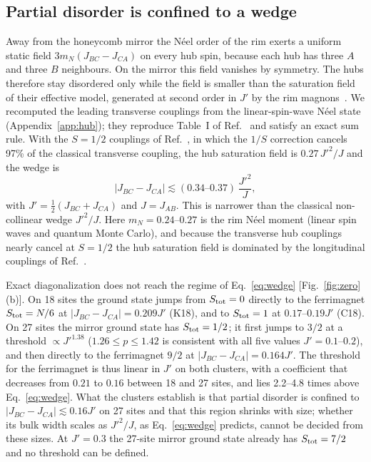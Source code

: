 \documentclass[prb,twocolumn,superscriptaddress,amsmath,amssymb,floatfix]{revtex4-2}
\begin{document}
\subsection{Partial disorder is confined to a wedge}
Away from the honeycomb mirror the N\'eel order of the rim exerts a uniform static field $3m_N(J_{BC}-J_{CA})$ on every hub spin, because each hub has three $A$ and three $B$ neighbours. On the mirror this field vanishes by symmetry. The hubs therefore stay disordered only while the field is smaller than the saturation field of their effective model, generated at second order in $J'$ by the rim magnons~\cite{SeifertVojta2019}. We recomputed the leading transverse couplings from the linear-spin-wave N\'eel state (Appendix~\ref{app:hub}); they reproduce Table~I of Ref.~\cite{SeifertVojta2019} and satisfy an exact sum rule. With the $S=1/2$ couplings of Ref.~\cite{SeifertVojta2019}, in which the $1/S$ correction cancels 97\% of the classical transverse coupling, the hub saturation field is $0.27\,J'^2/J$ and the wedge is
\begin{equation}
|J_{BC}-J_{CA}|\lesssim(0.34\text{--}0.37)\,\frac{J'^2}{J},
\label{eq:wedge}
\end{equation}
with $J'=\tfrac12(J_{BC}+J_{CA})$ and $J=J_{AB}$.
This is narrower than the classical non-collinear wedge $J'^2/J$. Here $m_N=0.24$--$0.27$ is the rim N\'eel moment (linear spin waves and quantum Monte Carlo), and because the transverse hub couplings nearly cancel at $S=1/2$ the hub saturation field is dominated by the longitudinal couplings of Ref.~\cite{SeifertVojta2019}.

Exact diagonalization does not reach the regime of Eq.~\eqref{eq:wedge} [Fig.~\ref{fig:zero}(b)]. On 18 sites the ground state jumps from $S_{\rm tot}=0$ directly to the ferrimagnet $S_{\rm tot}=N/6$ at $|J_{BC}-J_{CA}|=0.209J'$ (K18), and to $S_{\rm tot}=1$ at $0.17$--$0.19J'$ (C18). On 27 sites the mirror ground state has $S_{\rm tot}=1/2$; it first jumps to $3/2$ at a threshold $\propto J'^{1.38}$ ($1.26\le p\le1.42$ is consistent with all five values $J'=0.1$--$0.2$), and then directly to the ferrimagnet $9/2$ at $|J_{BC}-J_{CA}|=0.164J'$. The threshold for the ferrimagnet is thus linear in $J'$ on both clusters, with a coefficient that decreases from $0.21$ to $0.16$ between 18 and 27 sites, and lies 2.2--4.8 times above Eq.~\eqref{eq:wedge}. What the clusters establish is that partial disorder is confined to $|J_{BC}-J_{CA}|\lesssim0.16J'$ on 27 sites and that this region shrinks with size; whether its bulk width scales as $J'^2/J$, as Eq.~\eqref{eq:wedge} predicts, cannot be decided from these sizes. At $J'=0.3$ the 27-site mirror ground state already has $S_{\rm tot}=7/2$ and no threshold can be defined.
\end{document}
